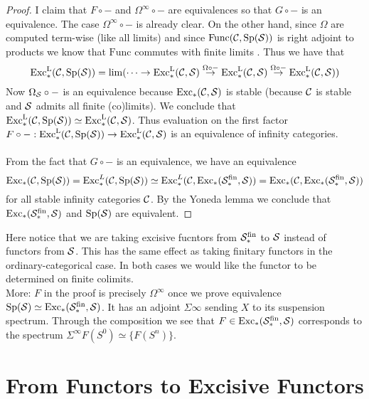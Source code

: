\documentclass[a4paper]{article}
\begin{document}
\begin{thm}{}{}
\begin{proof}
I claim that $F\circ -$ and $\Omega^\infty\circ -$ are equivalences so that $G\circ -$ is an equivalence. The case $\Omega^\infty\circ -$ is already clear. On the other hand, since $\Omega$ are computed term-wise (like all limits) and since $\text{Func}(\mathcal{C},\text{Sp}(\mathcal{S}))$ is right adjoint to products we know that $\text{Func}$ commutes with finite limits . Thus we have that $$\text{Exc}_\ast^\text{L}(\mathcal{C},\text{Sp}(\mathcal{S}))=\lim(\cdots\rightarrow\text{Exc}_\ast^{\text{L}}(\mathcal{C},\mathcal{S})\overset{\Omega\circ-}{\rightarrow}\text{Exc}_\ast^{\text{L}}(\mathcal{C},\mathcal{S})\overset{\Omega\circ-}{\rightarrow}\text{Exc}_\ast^{\text{L}}(\mathcal{C},\mathcal{S}))$$ Now $\Omega_{\mathcal{S}}\circ -$ is an equivalence because $\text{Exc}_\ast(\mathcal{C},\mathcal{S})$ is stable (because $\mathcal{C}$ is stable and $\mathcal{S}$ admits all finite (co)limits). We conclude that $\text{Exc}_\ast^{\text{L}}(\mathcal{C},\text{Sp}(\mathcal{S}))\simeq\text{Exc}_\ast^{\text{L}}(\mathcal{C},\mathcal{S})$. Thus evaluation on the first factor $F\circ -:\text{Exc}_\ast^{\text{L}}(\mathcal{C},\text{Sp}(\mathcal{S}))\to\text{Exc}_\ast^{\text{L}}(\mathcal{C},\mathcal{S})$ is an equivalence of infinity categories. \\~\\

From the fact that $G\circ -$ is an equivalence, we have an equivalence $$\text{Exc}_\ast(\mathcal{C},\text{Sp}(\mathcal{S}))=\text{Exc}_\ast^L(\mathcal{C},\text{Sp}(\mathcal{S}))\simeq\text{Exc}_\ast^L(\mathcal{C},\text{Exc}_\ast(\mathcal{S}_\ast^\text{fin},\mathcal{S}))=\text{Exc}_\ast(\mathcal{C},\text{Exc}_\ast(\mathcal{S}_\ast^\text{fin},\mathcal{S}))$$ for all stable infinity categories $\mathcal{C}$. By the Yoneda lemma we conclude that $\text{Exc}_\ast(\mathcal{S}_\ast^\text{fin},\mathcal{S})$ and $\text{Sp}(\mathcal{S})$ are equivalent. 
\end{proof}
\end{thm}

Here notice that we are taking excisive fucntors from $\mathcal{S}_\ast^\text{fin}$ to $\mathcal{S}$ instead of functors from $\mathcal{S}$. This has the same effect as taking finitary functors in the ordinary-categorical case. In both cases we would like the functor to be determined on finite colimits. \\

More: $F$ in the proof is precisely $\Omega^\infty$ once we prove equivalence $\text{Sp}(\mathcal{S})\simeq\text{Exc}_\ast(\mathcal{S}_\ast^\text{fin},\mathcal{S})$. It has an adjoint $\Sigma\infty$ sending $X$ to its suspension spectrum. Through the composition we see that $F\in\text{Exc}_\ast(\mathcal{S}_\ast^\text{fin},\mathcal{S})$ corresponds to the spectrum $\Sigma^\infty F(S^0)\simeq\{F(S^n)\}$. 

\pagebreak
\section{From Functors to Excisive Functors}
\end{document}

